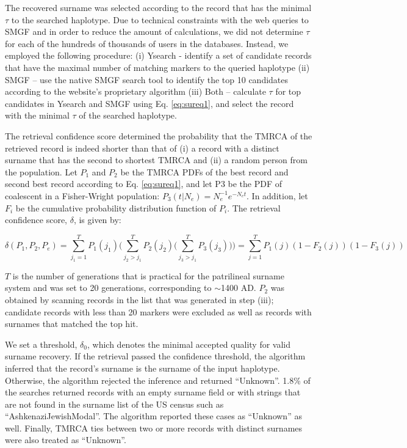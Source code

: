 The recovered surname was selected according to the record that has the minimal $\tau$ to the searched haplotype. Due to technical constraints with the web queries to SMGF and in order to reduce the amount of calculations, we did not determine $\tau$ for each of the hundreds of thousands of users in the databases. Instead, we employed the following procedure: (i) Ysearch - identify a set of candidate records that have the maximal number of matching markers to the queried haplotype (ii) SMGF – use the native SMGF search tool to identify the top 10 candidates according to the website’s proprietary algorithm (iii) Both – calculate $\tau$ for top candidates in Ysearch and SMGF using Eq. \ref{eq:sureq1}, and select the record with the minimal $\tau$ of the searched haplotype. 

The retrieval confidence score determined the probability that the TMRCA of the retrieved record is indeed shorter than that of (i) a record with a distinct surname that has the second to shortest TMRCA and (ii) a random person from the population. Let $P_1$ and $P_2$ be the TMRCA PDFs of the best record and second best record according to Eq. \ref{eq:sureq1}, and let P3 be the PDF of coalescent in a Fisher-Wright population: $P_3 (t|N_e)=N_e^{-1} e^{-N_e t}$. In addition, let $F_i$ be the cumulative probability distribution function of $P_i$. The retrieval confidence score, $\delta$, is given by:

\begin{equation}
\delta(P_1,P_2,P_e) = \sum_{j_1=1}^TP_1(j_1)
\Bigg(
\sum_{j_2>j_1}^TP_2(j_2)
 \Big(
 \sum_{j_3>j_1}^TP_3(j_3)
 \Big)
\Bigg) = \sum_{j=1}^TP_1(j)(1-F_2(j))(1-F_3(j))
\end{equation}

$T$ is the number of generations that is practical for the patrilineal surname system and was set to 20 generations, corresponding to $\sim$1400 AD. $P_2$ was obtained by scanning records in the list that was generated in step (iii); candidate records with less than 20 markers were excluded as well as records with surnames that matched the top hit.

We set a threshold, $\delta_0$, which denotes the minimal accepted quality for valid surname recovery. If the retrieval passed the confidence threshold, the algorithm inferred that the record's surname is the surname of the input haplotype. Otherwise, the algorithm rejected the inference and returned ``Unknown''. 1.8\% of the searches returned records with an empty surname field or with strings that are not found in the surname list of the US census such as ``AshkenaziJewishModal''. The algorithm reported these cases as ``Unknown'' as well. Finally, TMRCA ties between two or more records with distinct surnames were also treated as ``Unknown''. 

